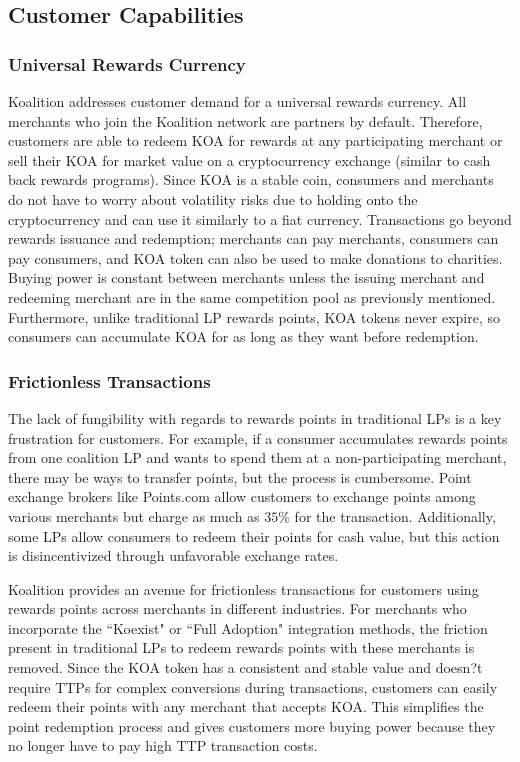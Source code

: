 \subsection{Customer Capabilities}

\subsubsection{Universal Rewards Currency}
Koalition addresses customer demand for a universal rewards currency. All merchants who join the Koalition network are partners by default. Therefore, customers are able to redeem KOA for rewards at any participating merchant or sell their KOA for market value on a cryptocurrency exchange (similar to cash back rewards programs). Since KOA is a stable coin, consumers and merchants do not have to worry about volatility risks due to holding onto the cryptocurrency and can use it similarly to a fiat currency. Transactions go beyond rewards issuance and redemption; merchants can pay merchants, consumers can pay consumers, and KOA token can also be used to make donations to charities. Buying power is constant between merchants unless the issuing merchant and redeeming merchant are in the same competition pool as previously mentioned. Furthermore, unlike traditional LP rewards points, KOA tokens never expire, so consumers can accumulate KOA for as long as they want before redemption.

\subsubsection{Frictionless Transactions}
The lack of fungibility with regards to rewards points in traditional LPs is a key frustration for customers. For example, if a consumer accumulates rewards points from one coalition LP and wants to spend them at a non-participating merchant, there may be ways to transfer points, but the process is cumbersome. Point exchange brokers like Points.com allow customers to exchange points among various merchants but charge as much as $35\%$ for the transaction. Additionally, some LPs allow consumers to redeem their points for cash value, but this action is disincentivized through unfavorable exchange rates.

Koalition provides an avenue for frictionless transactions for customers using rewards points across merchants in different industries. For merchants who incorporate the ``Koexist" or ``Full Adoption" integration methods, the friction present in traditional LPs to redeem rewards points with these merchants is removed. Since the KOA token has a consistent and stable value and doesn?t require TTPs for complex conversions during transactions, customers can easily redeem their points with any merchant that accepts KOA. This simplifies the point redemption process and gives customers more buying power because they no longer have to pay high TTP transaction costs. 

